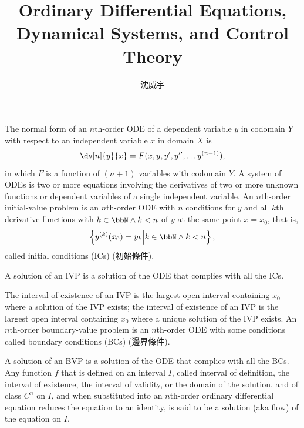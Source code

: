 \documentclass[a4paper,12pt]{report}
\begin{document}
\title{Ordinary Differential Equations, Dynamical Systems, and Control Theory}
\author{沈威宇}
\date{\temtoday}
\titletocdoc
{}
The normal form of an $n$th-order ODE of a dependent variable $y$ in codomain $Y$ with respect to an independent variable $x$ in domain $X$ is
\[\dv[n]{y}{x}=F(x,y,y',y'',\dots y^{(n-1)}),\]
in which $F$ is a function of $(n+1)$ variables with codomain $Y$.
A system of ODEs is two or more equations involving the derivatives of two or more unknown functions or dependent variables of a single independent variable.
An $n$th-order initial-value problem is an $n$th-order ODE with $n$ conditions for $y$ and all $k$th derivative functions with $k\in\bbN\land k<n$ of $y$ at the same point $x=x_0$, that is,
\[\left\{y^{(k)}(x_0)=y_k\middle| k\in\bbN\land k<n\right\},\]
called initial conditions (ICs) (初始條件).

A solution of an IVP is a solution of the ODE that complies with all the ICs.

The interval of existence of an IVP is the largest open interval containing $x_0$ where a solution of the IVP exists; the interval of existence of an IVP is the largest open interval containing $x_0$ where a unique solution of the IVP exists.
An $n$th-order boundary-value problem is an $n$th-order ODE with some conditions called boundary conditions (BCs) (邊界條件).

A solution of an BVP is a solution of the ODE that complies with all the BCs.
Any function $f$ that is defined on an interval $I$, called interval of definition, the interval of existence, the interval of validity, or the domain of the solution, and of class $C^n$ on $I$, and when substituted into an $n$th-order ordinary differential equation reduces the equation to an identity, is said to be a solution (aka flow) of the equation on $I$.
\end{document}
